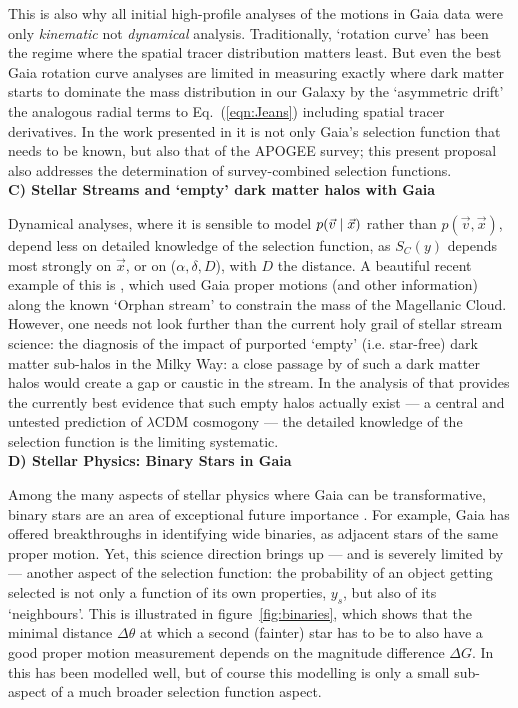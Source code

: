 This is also why all initial high-profile analyses of the motions in Gaia data \citep{Katz2018a,Antoja2018a} were only \emph{kinematic} not \emph{dynamical} analysis. Traditionally, `rotation curve' has been the regime where the spatial tracer distribution matters least. But even the best Gaia rotation curve analyses \citep[e.g.][]{Eilers2019a} are limited in measuring exactly where dark matter starts to dominate the mass distribution in our Galaxy by the `asymmetric drift'  the analogous radial terms to Eq.~(\ref{eqn:Jeans}) including spatial tracer derivatives. In the work presented in \cite{Eilers2019a} it is not only Gaia's selection function that needs to be known, but also that of the APOGEE survey; this present proposal also addresses the determination of survey-combined selection functions.\\

\noindent\textbf{C) Stellar Streams and `empty' dark matter halos with Gaia\ }

Dynamical analyses, where it is sensible to model $p(\vec{v}\mid\vec{x})$ rather than $p(\vec{v},\vec{x})$, depend less on detailed knowledge of the selection function, as $S_C(y)$ depends most strongly on $\vec{x}$, or on ($\alpha,\delta,D$), with $D$ the distance. A beautiful recent example of this is \citet{Erkal2019}, which used Gaia proper motions (and other information) along the known `Orphan stream' to constrain the mass of the Magellanic Cloud. However, one needs not look further than the current holy grail of stellar stream science: the diagnosis of the impact of purported `empty' (i.e. star-free) dark matter sub-halos in the Milky Way: a close passage by of such a dark matter halos would create a gap or caustic in the stream. In the analysis of \citet{Bonaca2019} that provides the currently best evidence that such empty halos actually exist --- a central and untested prediction of $\lambda$CDM cosmogony --- the detailed knowledge of the selection function is the limiting systematic. 
\\

\noindent\textbf{D) Stellar Physics: Binary Stars in Gaia}

Among the many aspects of stellar physics where Gaia can be transformative, binary stars are an area of exceptional future importance \citep[e.g.][]{Breivik2019}. For example, Gaia has offered breakthroughs in identifying wide binaries, as adjacent stars of the same proper motion. Yet, this science direction brings up --- and is severely limited by --- another aspect of the selection function: the probability of an object getting selected is not only a function of its own properties, $y_s$, but also of its `neighbours'. This is illustrated in figure~\ref{fig:binaries}, which shows that the minimal distance $\Delta\theta$ at which a second (fainter) star has to be to also have a good proper motion measurement depends on the magnitude difference $\Delta G$. In \citet{ElBadry2019} this has been modelled well, but of course this modelling is only a small sub-aspect of a much broader selection function aspect.

